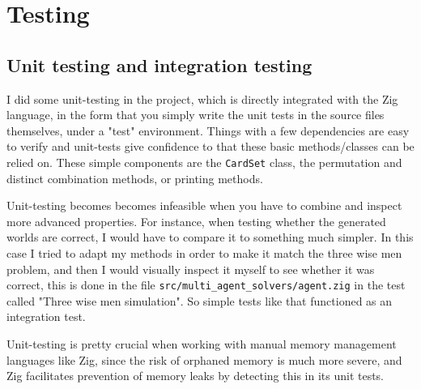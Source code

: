 \section{Testing}

\subsection{Unit testing and integration testing}
I did some unit-testing in the project, which is directly integrated with the Zig language, in the form that you simply write the unit tests in the source files themselves, under a "test" environment. 
Things with a few dependencies are easy to verify and unit-tests give confidence to that these basic methods/classes can be relied on. These simple components are the {\tt CardSet} class, the permutation and distinct combination methods, or printing methods. 

Unit-testing becomes becomes infeasible when you have to combine and inspect more advanced properties.
For instance, when testing whether the generated worlds are correct, I would have to compare it to something much simpler.
In this case I tried to adapt my methods in order to make it match the three wise men problem, and then I would visually inspect it myself to see whether it was correct, this is done in the file {\tt src/multi\_agent\_solvers/agent.zig} in the test called "Three wise men simulation". So simple tests like that functioned as an integration test.

Unit-testing is pretty crucial when working with manual memory management languages like Zig, since the risk of orphaned memory is much more severe, and Zig facilitates prevention of memory leaks by detecting this in its unit tests. 


